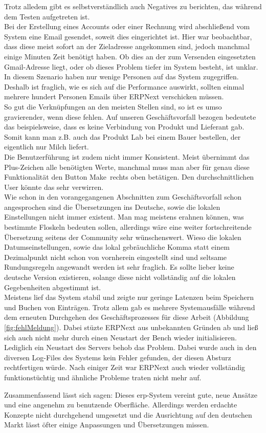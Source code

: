 Trotz alledem gibt es selbstverständlich auch Negatives zu berichten, das während dem Testen aufgetreten ist. \\
Bei der Erstellung eines Accounts oder einer Rechnung wird abschließend vom System eine Email gesendet, soweit dies eingerichtet ist. Hier war beobachtbar, dass diese meist sofort an der Zieladresse angekommen sind, jedoch manchmal einige Minuten Zeit benötigt haben. Ob dies an der zum Versenden eingesetzten Gmail-Adresse liegt, oder ob dieses Problem tiefer im System besteht, ist unklar. In diesem Szenario haben nur wenige Personen auf das System zugegriffen. Deshalb ist fraglich, wie es sich auf die Performance auswirkt, sollten einmal mehrere hundert Personen Emails über ERPNext verschicken müssen. \\
So gut die Verknüpfungen an den meisten Stellen sind, so ist es umso gravierender, wenn diese fehlen. Auf unseren Geschäftsvorfall bezogen bedeutete das beispielsweise, dass es keine Verbindung von Produkt und Lieferant gab. Somit kann man z.B. auch das Produkt Lab bei einem Bauer bestellen, der eigentlich nur Milch liefert. \\
Die Benutzerführung ist zudem nicht immer Konsistent. Meist übernimmt das Plus-Zeichen alle benötigten Werte, manchmal muss man aber für genau diese Funktionalität den Button \glqq Make\grqq\ rechts oben betätigen. Den durchschnittlichen User könnte das sehr verwirren. \\
Wie schon in den vorangegangenen Abschnitten zum Geschäftsvorfall schon angesprochen sind die Übersetzungen ins Deutsche, sowie die lokalen Einstellungen nicht immer existent. Man mag meistens erahnen können, was bestimmte Floskeln bedeuten sollen, allerdings wäre eine weiter fortschreitende Übersetzung seitens der Community sehr wünschenswert. Wieso die lokalen Datumseinstellungen, sowie das lokal gebräuchliche Komma statt einem Dezimalpunkt nicht schon von vornherein eingestellt sind und seltsame Rundungsregeln angewandt werden ist sehr fraglich. Es sollte lieber keine deutsche Version existieren, solange diese nicht vollständig auf die lokalen Gegebenheiten abgestimmt ist. \\
Meistens lief das System stabil und zeigte nur geringe Latenzen beim Speichern und Buchen von Einträgen. Trotz allem gab es mehrere Systemausfälle während dem erneuten Durchgehen des Geschäftsprozesses für diese Arbeit (\vgl Abbildung \ref{fig:fehlMeldung}). Dabei stüzte ERPNext aus unbekannten Gründen ab und ließ sich auch nicht mehr durch einen Neustart der Bench wieder initialisieren. Lediglich ein Neustart des Servers behob das Problem. Dabei wurde auch in den diversen Log-Files des Systems kein Fehler gefunden, der diesen Absturz rechtfertigen würde. Nach einiger Zeit war ERPNext auch wieder vollständig funktionstüchtig und ähnliche Probleme traten nicht mehr auf.

Zusammenfassend lässt sich sagen: Dieses \gls{erp}-System vereint gute, neue Ansätze und eine angenehm zu benutzende Oberfläche. Allerdings werden erdachte Konzepte nicht durchgehend umgesetzt und die Ausrichtung auf den deutschen Markt lässt öfter einige Anpassungen und Übersetzungen missen.